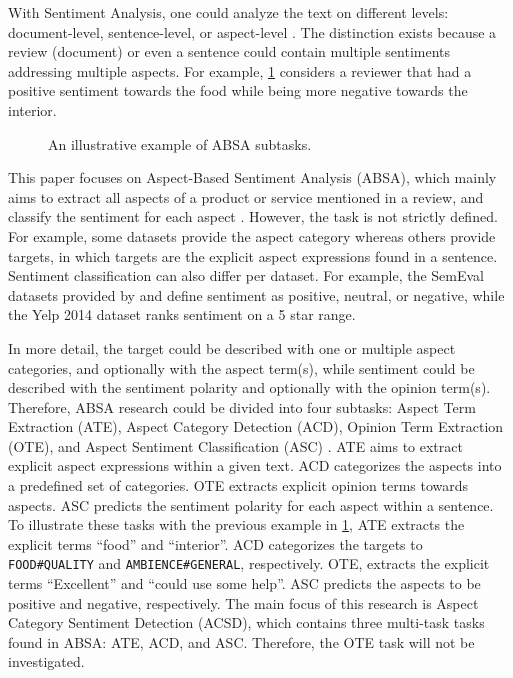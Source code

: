 \documentclass[american, oneside]{ecsgdp}
\begin{document}
With Sentiment Analysis, one could analyze the text on different levels: document-level, sentence-level, or aspect-level \parencite{Liu2012SAOP}. The distinction exists because a review (document) or even a sentence could contain multiple sentiments addressing multiple aspects. For example, \cref{fig:example_review} considers a reviewer that had a positive sentiment towards the food while being more negative towards the interior.

\begin{figure}[htbp]
  \centering
  
  \caption{An illustrative example of ABSA subtasks.}
  \label{fig:example_review}
\end{figure}

This paper focuses on Aspect-Based Sentiment Analysis (ABSA), which mainly aims to extract all aspects of a product or service mentioned in a review, and classify the sentiment for each aspect \parencite{Liu2012SAOP}. However, the task is not strictly defined. For example, some datasets provide the aspect category whereas others provide targets, in which targets are the explicit aspect expressions found in a sentence. Sentiment classification can also differ per dataset. For example, the SemEval datasets provided by \textcite{Pontiki2015SemEval} and \textcite{Pontiki2016SemEval} define sentiment as positive, neutral, or negative, while the Yelp 2014 dataset \parencite{Tang2016Yelp} ranks sentiment on a 5 star range.

In more detail, the target could be described with one or multiple aspect categories, and optionally with the aspect term(s), while sentiment could be described with the sentiment polarity and optionally with the opinion term(s). Therefore, ABSA research could be divided into four subtasks: Aspect Term Extraction (ATE), Aspect Category Detection (ACD), Opinion Term Extraction (OTE), and Aspect Sentiment Classification (ASC) \parencite{Zhang2022Survey}. ATE aims to extract explicit aspect expressions within a given text. ACD categorizes the aspects into a predefined set of categories. OTE extracts explicit opinion terms towards aspects. ASC predicts the sentiment polarity for each aspect within a sentence. To illustrate these tasks with the previous example in \cref{fig:example_review}, ATE extracts the explicit terms ``food'' and ``interior''. ACD categorizes the targets to \texttt{FOOD\#QUALITY} and \texttt{AMBIENCE\#GENERAL}, respectively. OTE, extracts the explicit terms ``Excellent'' and ``could use some help''. ASC predicts the aspects to be positive and negative, respectively. The main focus of this research is Aspect Category Sentiment Detection (ACSD), which contains three multi-task tasks found in ABSA: ATE, ACD, and ASC. Therefore, the OTE task will not be investigated.
\end{document}
